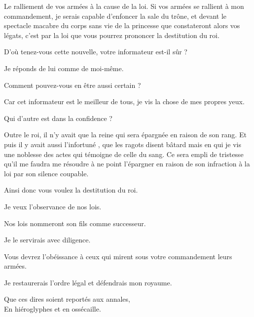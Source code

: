 \begin{drama}
  \generalspeaks Le ralliement de vos armées à la cause de la loi. Si vos armées se rallient à mon commandement, je serais capable d’enfoncer la sale du trône, et devant le spectacle macabre du corps sans vie de la princesse que constateront alors vos légats, c’est par la loi que vous pourrez prononcer la destitution du roi.

  \nobleOnespeaks D’où tenez-vous cette nouvelle, votre informateur est-il sûr ?

  \generalspeaks Je réponds de lui comme de moi-même.

  \nobleTwospeaks Comment pouvez-vous en être aussi certain ?

  \generalspeaks Car cet informateur est le meilleur de tous, je vis la chose de mes propres yeux.

  \nobleOnespeaks Qui d’autre est dans la confidence ?

  \generalspeaks Outre le roi, il n’y avait que la reine qui sera épargnée en raison de son rang. Et puis il y avait aussi l’infortuné \elena{}, que les ragots disent bâtard mais en qui je vis une noblesse des actes qui témoigne de celle du sang. Ce sera empli de tristesse qu’il me faudra me résoudre à  ne point l’épargner en raison de son infraction à la loi par son silence coupable.

  \nobleOnespeaks Ainsi donc vous voulez la destitution du roi.

  \generalspeaks Je veux l’observance de nos lois.

  \nobleTwospeaks Nos lois nommeront son fils comme successeur.

  \generalspeaks Je le servirais avec diligence.

  \nobleTreespeaks Vous devrez l’obéissance à ceux qui mirent sous votre commandement leurs armées.

  \generalspeaks Je restaurerais l’ordre légal et défendrais mon royaume.

  \begin{minipage}[t]{\linewidth}
    Que ces dires soient reportés aux annales,\\
    En hiéroglyphes et en ossécaille.
  \end{minipage}

\end{drama}

\scene

\StageDirII{\elena, \vladimir}


